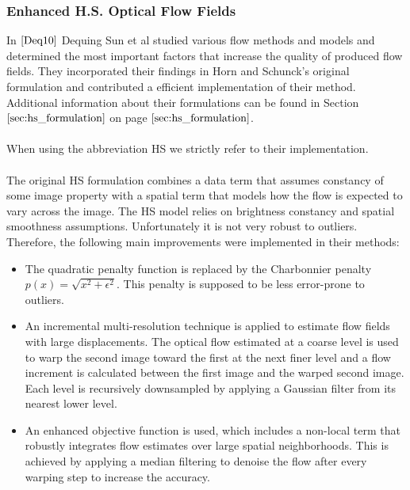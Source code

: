 \subsubsection{Enhanced H.S. Optical Flow Fields}
\label{sec:hs_flows}
In $\cite{Deq10}$ Dequing Sun et al studied various flow methods and models and determined the most important factors that increase the quality of produced flow fields. They incorporated their findings in Horn and Schunck's original formulation and contributed a efficient implementation of their method. Additional information about their formulations can be found in Section $\ref{sec:hs_formulation}$ on page $\pageref{sec:hs_formulation}$. \\ \\
When using the abbreviation HS we strictly refer to their implementation. \\ \\
The original HS formulation combines a data term that assumes constancy of some image property with a spatial term that models how the flow is expected to vary across the image. The HS model relies on brightness constancy and spatial smoothness assumptions. Unfortunately it is not very robust to outliers. Therefore, the following main improvements were implemented in their methods:
\begin{itemize}
  \item The quadratic penalty function is replaced by the Charbonnier penalty $p\left( x \right) = \sqrt{x^2 + \epsilon^2}$. This penalty is supposed to be less error-prone to outliers.
  \item An incremental multi-resolution technique is applied to estimate flow fields with large displacements. The optical flow estimated at a coarse level is used to warp the second image toward the first at the next finer level and a flow increment is calculated between the first image and the warped second image. Each level is recursively downsampled by applying a Gaussian filter from its nearest lower level.
  \item An enhanced objective function is used, which includes a non-local term that robustly integrates flow estimates over large spatial neighborhoods. This is achieved by applying a median filtering to denoise the flow after every warping step to increase the accuracy.
\end{itemize}

